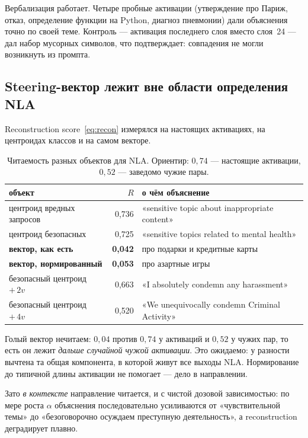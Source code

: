 \documentclass[11pt,a4paper]{article}
\begin{document}
Вербализация работает. Четыре пробные активации (утверждение про Париж, отказ,
определение функции на Python, диагноз пневмонии) дали объяснения точно по своей
теме. Контроль --- активация последнего слоя вместо слоя~24 --- дал набор
мусорных символов, что подтверждает: совпадения не могли возникнуть из промпта.

\subsection{Steering-вектор лежит вне области определения NLA}
\label{sec:ood}

Reconstruction score~\eqref{eq:recon} измерялся на настоящих активациях, на
центроидах классов и на самом векторе.

\begin{table}[htbp]
\centering
\caption{Читаемость разных объектов для NLA. Ориентир: $0{,}74$ --- настоящие
активации, $0{,}52$ --- заведомо чужие пары.}
\label{tab:ood}
\small
\begin{tabular}{lrl}
\toprule
объект & $R$ & о чём объяснение \\
\midrule
центроид вредных запросов & 0{,}736 & «sensitive topic about inappropriate content» \\
центроид безопасных & 0{,}725 & «sensitive topics related to mental health» \\
\textbf{вектор, как есть} & \textbf{0{,}042} & про подарки и кредитные карты \\
\textbf{вектор, нормированный} & \textbf{0{,}053} & про азартные игры \\
безопасный центроид $+\,2v$ & 0{,}663 & «I absolutely condemn any harassment» \\
безопасный центроид $+\,4v$ & 0{,}520 & «We unequivocally condemn Criminal Activity» \\
\bottomrule
\end{tabular}
\end{table}

Голый вектор нечитаем: $0{,}04$ против $0{,}74$ у активаций и $0{,}52$ у чужих
пар, то есть он лежит \emph{дальше случайной чужой активации}. Это ожидаемо: у
разности вычтена та общая компонента, в которой живут все выходы NLA.
Нормирование до типичной длины активации не помогает --- дело в направлении.

Зато \emph{в контексте} направление читается, и с чистой дозовой зависимостью:
по мере роста $\alpha$ объяснения последовательно усиливаются от «чувствительной
темы» до «безоговорочно осуждаем преступную деятельность», а reconstruction
деградирует плавно.
\end{document}
